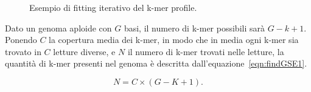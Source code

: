 \documentclass[crop=false, class=book]{standalone}
\begin{document}
	\begin{figure}[h]
		\centering
		 \quad
		 \quad
		\caption{Esempio di \gls{fitting} iterativo del k-mer profile.}
		\label{fig:findGSEfitting}
	\end{figure}

	Dato un genoma aploide con $G$ basi, il numero di k-mer possibili sarà $G-k+1$. Ponendo $C$ la copertura media dei k-mer, in modo che in media ogni k-mer sia trovato in $C$ letture diverse, e $N$ il numero di k-mer trovati nelle letture, la quantità di k-mer presenti nel genoma è descritta dall'equazione~\vref{eqn:findGSE1}. 	
	
	\begin{equation}
		\label{eqn:findGSE1}
		N=C \times (G-K+1).
	\end{equation}
		
\end{document}
